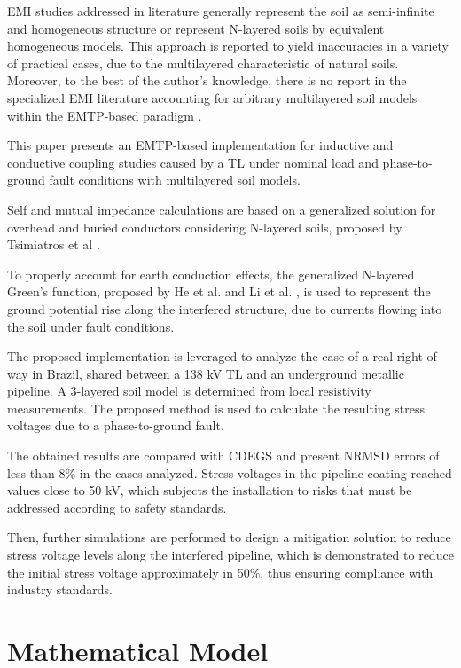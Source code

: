 \documentclass{IEEEtran4PSCC}
\begin{document}
EMI studies addressed in literature generally represent the soil as semi-infinite and homogeneous structure or represent N-layered soils by equivalent homogeneous models. This  approach is reported to yield inaccuracies in a variety of practical cases, due to the multilayered characteristic of natural soils. Moreover, to the best of the author's knowledge, there is no report in the specialized EMI literature accounting for arbitrary multilayered soil models within the EMTP-based paradigm \cite{Qi2013,Wu2017,Alexandru2020}.

This paper presents an EMTP-based implementation for inductive and conductive coupling studies caused by a TL under nominal load and phase-to-ground fault conditions with multilayered soil models.

Self and mutual impedance calculations are based on a generalized solution for overhead and buried conductors considering N-layered soils, proposed by Tsimiatros et al \cite{Tsiamitros2008a}.

To properly account for earth conduction effects, the generalized N-layered Green's function, proposed by He et al. \cite{He2012} and Li et al. \cite{Li2006}, is used to represent the ground potential rise along the interfered structure, due to currents flowing into the soil under fault conditions.

The proposed implementation is leveraged to analyze the case of a real right-of-way in Brazil, shared between a 138 kV TL and an underground metallic pipeline. A 3-layered soil model is determined from local resistivity measurements. The proposed method is used to calculate the resulting stress voltages due to a phase-to-ground fault. 

The obtained results are compared with CDEGS and present NRMSD errors of less than 8\% in the cases analyzed. Stress voltages in the pipeline coating reached values close to 50 kV, which subjects the installation to risks that must be addressed according to safety standards. 

Then, further simulations are performed to design a mitigation solution to reduce stress voltage levels along the interfered pipeline, which is demonstrated to reduce the initial stress voltage approximately in 50\%, thus ensuring compliance with industry standards.

\section{Mathematical Model}
\end{document}
